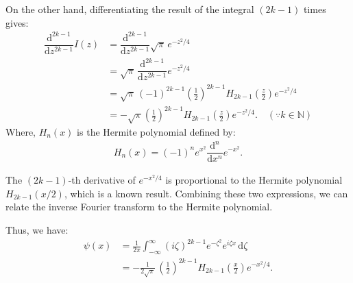 \documentclass[a4paper,12pt]{article}
\newcommand{\z}{\zeta}
\newcommand{\dd}{\mathrm{d}}
\newcommand{\diff}[2]{\dfrac{\dd #1}{\dd #2}}
\begin{document}
  On the other hand, differentiating the result of the integral $(2k-1)$ times gives:
  \begin{align*}
    \diff{^{2k-1}}{z^{2k-1}} I(z) &= \diff{^{2k-1}}{z^{2k-1}} \sqrt{\pi} \, e^{-z^2/4} \\
    &= \sqrt{\pi} \, \diff{^{2k-1}}{z^{2k-1}} e^{-z^2/4} \\
    &= \sqrt{\pi} \, (-1)^{2k-1} \left(\frac{1}{2}\right)^{2k-1} H_{2k-1}\left(\frac{z}{2}\right) e^{-z^2/4}\\
    &= - \sqrt{\pi} \left(\frac{1}{2}\right)^{2k-1} H_{2k-1}\left(\frac{z}{2}\right) e^{-z^2/4}. \quad \left(\because k \in \mathbb{N}\right)
  \end{align*}
  Where, $H_n(x)$ is the Hermite polynomial defined by:
  \begin{align}
    H_n(x) = (-1)^n e^{x^2} \diff{^n}{x^n} e^{-x^2}.
  \end{align}

  The $(2k-1)$-th derivative of $e^{-x^2/4}$ is proportional to the Hermite polynomial $H_{2k-1}(x/2)$, which is a known result. Combining these two expressions, we can relate the inverse Fourier transform to the Hermite polynomial.

  Thus, we have:
  \begin{align*}
    \psi(x) &= \frac{1}{2\pi}\int_{-\infty}^{\infty} (i\z)^{2k-1} e^{-\z^2} e^{i \z x} \, \dd\z \\
    &= -\frac{1}{2\sqrt{\pi}} \, \left(\frac{1}{2}\right)^{2k-1} H_{2k-1}\left(\frac{x}{2}\right) e^{-x^2/4}. 
  \end{align*}
\clearpage

\nocite{*} 
 
 
\end{document}
